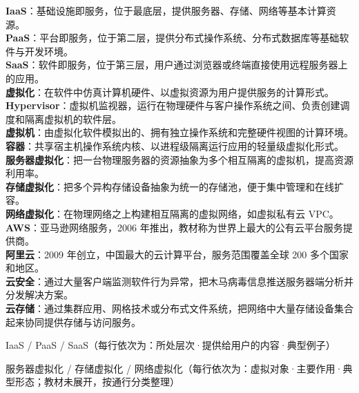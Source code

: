 \documentclass[a4paper,11pt]{article}
\begin{document}
\begin{keyterms}
\textbf{IaaS}：基础设施即服务，位于最底层，提供服务器、存储、网络等基本计算资源。\\
\textbf{PaaS}：平台即服务，位于第二层，提供分布式操作系统、分布式数据库等基础软件与开发环境。\\
\textbf{SaaS}：软件即服务，位于第三层，用户通过浏览器或终端直接使用远程服务器上的应用。\\
\textbf{虚拟化}：在软件中仿真计算机硬件、以虚拟资源为用户提供服务的计算形式。\\
\textbf{Hypervisor}：虚拟机监视器，运行在物理硬件与客户操作系统之间、负责创建调度和隔离虚拟机的软件层。\\
\textbf{虚拟机}：由虚拟化软件模拟出的、拥有独立操作系统和完整硬件视图的计算环境。\\
\textbf{容器}：共享宿主机操作系统内核、以进程级隔离运行应用的轻量级虚拟化形式。\\
\textbf{服务器虚拟化}：把一台物理服务器的资源抽象为多个相互隔离的虚拟机，提高资源利用率。\\
\textbf{存储虚拟化}：把多个异构存储设备抽象为统一的存储池，便于集中管理和在线扩容。\\
\textbf{网络虚拟化}：在物理网络之上构建相互隔离的虚拟网络，如虚拟私有云 VPC。\\
\textbf{AWS}：亚马逊网络服务，2006 年推出，教材称为世界上最大的公有云平台服务提供商。\\
\textbf{阿里云}：2009 年创立，中国最大的云计算平台，服务范围覆盖全球 200 多个国家和地区。\\
\textbf{云安全}：通过大量客户端监测软件行为异常，把木马病毒信息推送服务器端分析并分发解决方案。\\
\textbf{云存储}：通过集群应用、网格技术或分布式文件系统，把网络中大量存储设备集合起来协同提供存储与访问服务。
\end{keyterms}

\begin{contrast}{IaaS / PaaS / SaaS（每行依次为：所处层次·提供给用户的内容·典型例子）}
\end{contrast}

\begin{contrast}{服务器虚拟化 / 存储虚拟化 / 网络虚拟化（每行依次为：虚拟对象·主要作用·典型形态；教材未展开，按通行分类整理）}
\end{contrast}
\end{document}
